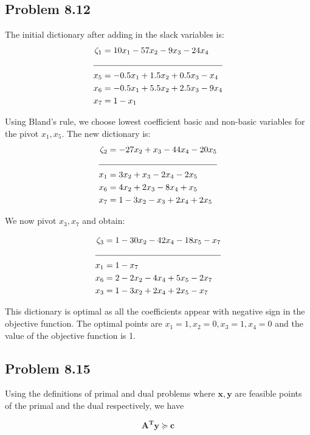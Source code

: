 \documentclass[letterpaper,12pt]{article}
\theoremstyle{definition}
\begin{document}
\subsection*{Problem 8.12 }

The initial dictionary after adding in the slack variables is:
\begin{align*}
  \zeta_1 &= 10x_1-57x_2-9x_3-24x_4\\
  \cline{1-2}
  x_5 &= -0.5x_1 + 1.5x_2+0.5x_3-x_4\\
  x_6 &= -0.5x_1+5.5x_2 + 2.5x_3 -9x_4\\
  x_7 &= 1-x_1\\
\end{align*}

Using Bland's rule, we choose lowest coefficient basic and non-basic  variables for the pivot $x_1, x_5$. The new dictionary is:
\begin{align*}
  \zeta_2 &= -27x_2+x_3-44x_4 - 20x_5\\
  \cline{1-2}
  x_1 &= 3x_2 + x_3 -2x_4-2x_5\\
  x_6 &= 4x_2+2x_3-8x_4+x_5\\
  x_7 &= 1-3x_2-x_3+2x_4+2x_5\\
\end{align*}

We now pivot $x_3, x_7$ and obtain:

\begin{align*}
  \zeta_3 &= 1-30x_2-42x_4-18x_5-x_7\\
  \cline{1-2}
  x_1 &= 1-x_7 \\
  x_6 &= 2-2x_2-4x_4+5x_5-2x_7 \\
  x_3 &= 1-3x_2+2x_4+2x_5-x_7 \\
\end{align*}

\begin{flushleft}
This dictionary is optimal as all the coefficients appear with negative sign in the objective function. The
optimal points are $x_1=1, x_2=0, x_3=1, x_4=0$ and the value of the objective function is 1.
\end{flushleft}

\subsection*{Problem 8.15}
  Using the definitions of primal and dual problems where $\bm{x, y}$ are feasible points of the primal and the dual respectively, we have


\begin{equation*}
    \bm{A^Ty} \succeq \bm{c} 
\end{equation*}
\end{document}
